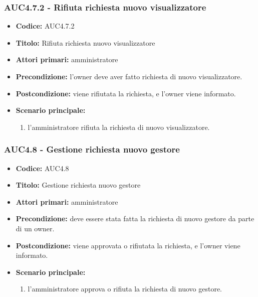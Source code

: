 \documentclass[casi-duso]{subfiles}
\begin{document}
\subsubsection{AUC4.7.2 - Rifiuta richiesta nuovo visualizzatore}%
\label{subsub:AUC4.7.2}
\begin{itemize}
  \item \textbf{Codice:} AUC4.7.2
  \item \textbf{Titolo:} Rifiuta richiesta nuovo visualizzatore
  \item \textbf{Attori primari:} amministratore
  \item \textbf{Precondizione:} l'owner deve aver fatto richiesta di nuovo visualizzatore.
  \item \textbf{Postcondizione:} viene rifiutata la richiesta, e l'owner viene informato.
  \item \textbf{Scenario principale:}
  \begin{enumerate}
    \item l'amministratore rifiuta la richiesta di nuovo visualizzatore.
  \end{enumerate}
\end{itemize}  

\subsubsection{AUC4.8 - Gestione richiesta nuovo gestore}%
\label{subsub:AUC4.8}
\begin{itemize}
  \item \textbf{Codice:} AUC4.8
  \item \textbf{Titolo:} Gestione richiesta nuovo gestore
  \item \textbf{Attori primari:} amministratore
  \item \textbf{Precondizione:} deve essere stata fatta la richiesta di nuovo gestore da parte di un owner.
  \item \textbf{Postcondizione:} viene approvata o rifiutata la richiesta, e l'owner viene informato.
  \item \textbf{Scenario principale:}
  \begin{enumerate}
    \item l'amministratore approva o rifiuta la richiesta di nuovo gestore.
  \end{enumerate}
\end{itemize}
\end{document}
